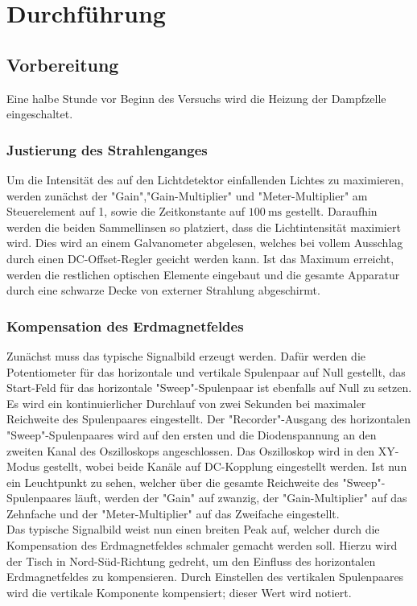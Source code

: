 \section{Durchführung}
\label{sec:durchführung}
\subsection{Vorbereitung}
Eine halbe Stunde vor Beginn des Versuchs wird die Heizung der Dampfzelle eingeschaltet.

\subsubsection{Justierung des Strahlenganges}
Um die Intensität des auf den Lichtdetektor einfallenden Lichtes zu maximieren, werden zunächst der "Gain","Gain-Multiplier" und "Meter-Multiplier" am Steuerelement auf 1, sowie die Zeitkonstante auf $\SI{100}{\milli\second}$ gestellt.
Daraufhin werden die beiden Sammellinsen so platziert, dass die Lichtintensität maximiert wird.
Dies wird an einem Galvanometer abgelesen, welches bei vollem Ausschlag durch einen DC-Offset-Regler geeicht werden kann.
Ist das Maximum erreicht, werden die restlichen optischen Elemente eingebaut und die gesamte Apparatur durch eine schwarze Decke von externer Strahlung abgeschirmt.

\subsubsection{Kompensation des Erdmagnetfeldes}
Zunächst muss das typische Signalbild erzeugt werden.
Dafür werden die Potentiometer für das horizontale und vertikale Spulenpaar auf Null gestellt, das Start-Feld für das horizontale "Sweep"-Spulenpaar ist ebenfalls auf Null zu setzen.
Es wird ein kontinuierlicher Durchlauf von zwei Sekunden bei maximaler Reichweite des Spulenpaares eingestellt.
Der "Recorder"-Ausgang des horizontalen "Sweep"-Spulenpaares wird auf den ersten und die Diodenspannung an den zweiten Kanal des Oszilloskops angeschlossen.
Das Oszilloskop wird in den XY-Modus gestellt, wobei beide Kanäle auf DC-Kopplung eingestellt werden.
Ist nun ein Leuchtpunkt zu sehen, welcher über die gesamte Reichweite des "Sweep"-Spulenpaares läuft, werden der "Gain" auf zwanzig, der "Gain-Multiplier" auf das Zehnfache und der "Meter-Multiplier" auf das Zweifache eingestellt.\\
Das typische Signalbild weist nun einen breiten Peak auf, welcher durch die Kompensation des Erdmagnetfeldes schmaler gemacht werden soll.
Hierzu wird der Tisch in Nord-Süd-Richtung gedreht, um den Einfluss des horizontalen Erdmagnetfeldes zu kompensieren.
Durch Einstellen des vertikalen Spulenpaares wird die vertikale Komponente kompensiert; dieser Wert wird notiert.

